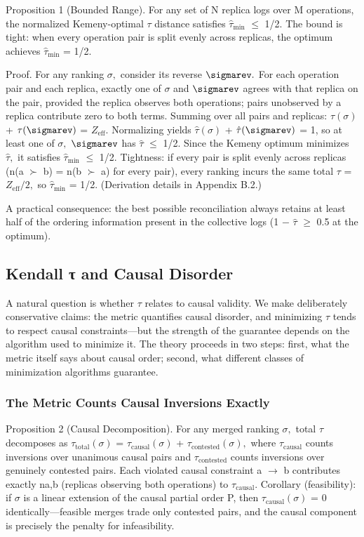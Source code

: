 \documentclass[10pt,twocolumn]{article}
\begin{document}
Proposition 1 (Bounded Range).  For any set of N replica logs over M operations, the normalized Kemeny-optimal $\tau$ distance satisfies $\hat{\tau}_{\mathrm{min}}$ $\leq$ 1/2. The bound is tight: when every operation pair is split evenly across replicas, the optimum achieves $\hat{\tau}_{\mathrm{min}}$ = 1/2.

Proof. For any ranking $\sigma,$ consider its reverse $\sigmarev.$ For each operation pair and each replica, exactly one of $\sigma$ and $\sigmarev$ agrees with that replica on the pair, provided the replica observes both operations; pairs unobserved by a replica contribute zero to both terms. Summing over all pairs and replicas: $\tau(\sigma)$ + $\tau(\sigmarev)$ = $Z_{\mathrm{eff}}.$ Normalizing yields $\hat{\tau}(\sigma)$ + $\hat{\tau}(\sigmarev)$ = 1, so at least one of $\sigma,$ $\sigmarev$ has $\hat{\tau}$ $\leq$ 1/2. Since the Kemeny optimum minimizes $\hat{\tau},$ it satisfies $\hat{\tau}_{\mathrm{min}}$ $\leq$ 1/2. Tightness: if every pair is split evenly across replicas (n(a $\succ$ b) = n(b $\succ$ a) for every pair), every ranking incurs the same total $\tau$ = $Z_{\mathrm{eff}}/2,$ so $\hat{\tau}_{\mathrm{min}}$ = 1/2. (Derivation details in Appendix B.2.)

A practical consequence: the best possible reconciliation always retains at least half of the ordering information present in the collective logs (1 $-$ $\hat{\tau}$ $\geq$ 0.5 at the optimum).

\subsection{Kendall τ and Causal Disorder}
A natural question is whether $\tau$ relates to causal validity. We make deliberately conservative claims: the metric quantifies causal disorder, and minimizing $\tau$ tends to respect causal constraints—but the strength of the guarantee depends on the algorithm used to minimize it. The theory proceeds in two steps: first, what the metric itself says about causal order; second, what different classes of minimization algorithms guarantee.

\subsubsection{The Metric Counts Causal Inversions Exactly}
Proposition 2 (Causal Decomposition).  For any merged ranking $\sigma,$ total $\tau$ decomposes as $\tau_{\mathrm{total}}(\sigma)$ = $\tau_{\mathrm{causal}}(\sigma)$ + $\tau_{\mathrm{contested}}(\sigma),$ where $\tau_{\mathrm{causal}}$ counts inversions over unanimous causal pairs and $\tau_{\mathrm{contested}}$ counts inversions over genuinely contested pairs. Each violated causal constraint a $\rightarrow$ b contributes exactly na,b (replicas observing both operations) to $\tau_{\mathrm{causal}}.$ Corollary (feasibility): if $\sigma$ is a linear extension of the causal partial order P, then $\tau_{\mathrm{causal}}(\sigma)$ = 0 identically—feasible merges trade only contested pairs, and the causal component is precisely the penalty for infeasibility.
\end{document}
